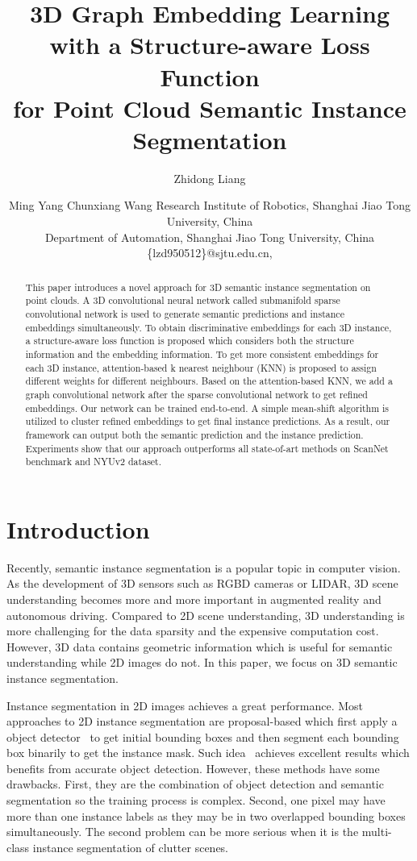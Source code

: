 \documentclass{article}
\title{3D Graph Embedding Learning with a Structure-aware Loss Function \\
	for Point Cloud Semantic Instance Segmentation}
\author{
Zhidong Liang
\and
Ming Yang\And
Chunxiang Wang
\affiliations
Research Institute of Robotics, Shanghai Jiao Tong University, China\\
Department of Automation, Shanghai Jiao Tong University, China
\emails
\{lzd950512\}@sjtu.edu.cn,
}
\begin{document}
\maketitle

\begin{abstract}
  This paper introduces a novel approach for 3D semantic instance segmentation on point clouds. A 3D convolutional neural network called submanifold sparse convolutional network is used to generate semantic predictions and instance embeddings simultaneously. To obtain discriminative embeddings for each 3D instance, a structure-aware loss function is proposed which considers both the structure information and the embedding information. To get more consistent embeddings for each 3D instance, attention-based k nearest neighbour (KNN) is proposed to assign different weights for different neighbours. Based on the attention-based KNN, we add a graph convolutional network after the sparse convolutional network to get refined embeddings. Our network can be trained end-to-end. A simple mean-shift algorithm is utilized to cluster refined embeddings to get final instance predictions. As a result, our framework can output both the semantic prediction and the instance prediction. Experiments show that our approach outperforms all state-of-art methods on ScanNet benchmark and NYUv2 dataset.
\end{abstract}

\section{Introduction}

Recently, semantic instance segmentation is a popular topic in computer vision. As the development of 3D sensors such as RGBD cameras or LIDAR, 3D scene understanding becomes more and more important in augmented reality and autonomous driving. Compared to 2D scene understanding, 3D understanding is more challenging for the data sparsity and the expensive computation cost. However, 3D data contains geometric information which is useful for semantic understanding while 2D images do not. In this paper, we focus on 3D semantic instance segmentation.

Instance segmentation in 2D images achieves a great performance. Most approaches to 2D instance segmentation are proposal-based which first apply a object detector~\cite{girshick2015fast,ren2015faster,redmon2016you,liu2016ssd,lin2017feature,lin2018focal} to get initial bounding boxes and then segment each bounding box binarily to get the instance mask. Such idea~\cite{he2017mask} achieves excellent results which benefits from accurate object detection. However, these methods have some drawbacks. First, they are the combination of object detection and semantic segmentation so the training process is complex. Second, one pixel may have more than one instance labels as they may be in two overlapped bounding boxes simultaneously. The second problem can be more serious when it is the multi-class instance segmentation of clutter scenes.
\end{document}
